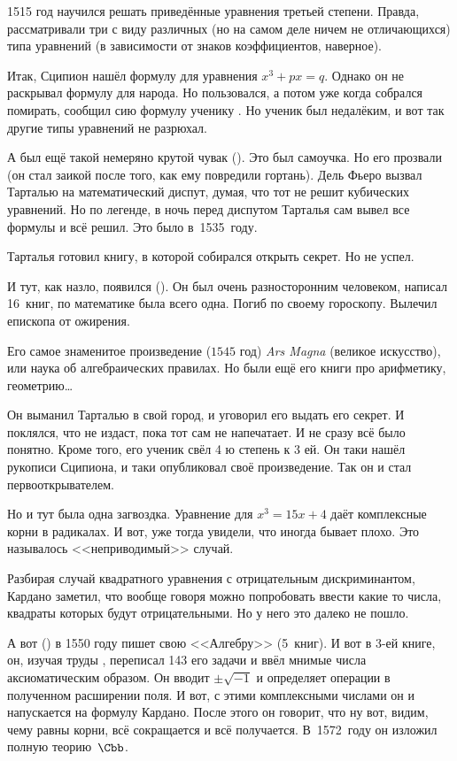 \documentclass[a4paper,oneside,fleqn,10pt]{article}
\begin{document}
1515 год  научился решать приведённые уравнения третьей степени.
Правда, рассматривали три с виду различных (но на самом деле ничем не отличающихся) типа
уравнений (в зависимости от знаков коэффициентов, наверное).

Итак, Сципион нашёл формулу для уравнения $x^3 + px = q$. Однако он не раскрывал формулу для народа.
Но пользовался, а потом уже когда собрался помирать, сообщил сию формулу ученику .
Но ученик был недалёким, и вот так другие типы уравнений не разрюхал.

А был ещё такой немеряно крутой чувак  (). Это был самоучка.
Но его прозвали  (он стал заикой после того, как ему повредили гортань).
Дель Фьеро вызвал Тарталью на математический диспут, думая, что тот не решит кубических уравнений.
Но по легенде, в ночь перед диспутом Тарталья сам вывел все формулы и всё решил.
Это было в~1535~году.

Тарталья готовил книгу, в которой собирался открыть секрет. Но не успел.

И тут, как назло, появился  (). Он был очень разносторонним человеком,
написал 16~книг, по математике была всего одна. Погиб по своему гороскопу.
Вылечил епископа от ожирения.

Его самое знаменитое произведение ($1545$ год) \emph{Ars Magna} (великое искусство),
или наука об алгебраических правилах. Но были ещё его книги про арифметику, геометрию\ldots

Он выманил Тарталью в свой город, и уговорил его выдать его секрет. И поклялся,
что не издаст, пока тот сам не напечатает. И не сразу всё было понятно.
Кроме того, его ученик 
свёл 4 ю степень к 3 ей. Он таки нашёл рукописи Сципиона, и
таки опубликовал своё произведение. Так он и стал первооткрывателем.

Но и тут была одна загвоздка. Уравнение для $x^3 = 15x + 4$ даёт комплексные корни в радикалах.
И вот, уже тогда увидели, что иногда бывает плохо. Это называлось <<неприводимый>> случай.

Разбирая случай квадратного уравнения
с отрицательным дискриминантом, Кардано заметил, что вообще говоря можно
попробовать ввести какие то числа, квадраты которых будут отрицательными.
Но у него это далеко не пошло.

А вот
 () в 1550 году пишет свою <<Алгебру>> (5~книг).
И вот в 3-ей книге, он, изучая труды , переписал 143 его задачи
и ввёл мнимые числа аксиоматическим образом. Он вводит $\pm\sqrt{-1}$ и определяет операции
в полученном расширении поля. И вот, с этими комплексными числами он и напускается
на формулу Кардано. После этого он говорит, что ну вот, видим, чему равны корни,
всё сокращается и всё получается. В~1572~году он изложил полную теорию~$\Cbb$.
\end{document}
